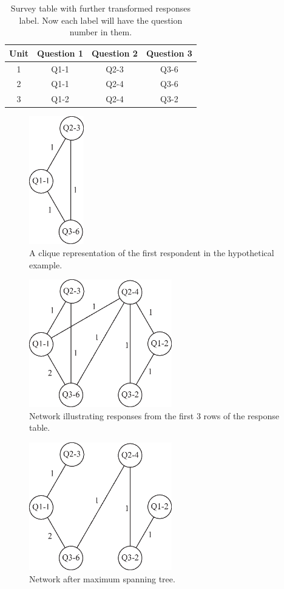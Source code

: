 \begin{table}
    \begin{tabular}[c]{||c c c c||}
        \hline
        \textbf{Unit} & \textbf{Question 1} & \textbf{Question 2} & \textbf{Question 3} \\
        \hline\hline
        1 & Q1-1 & Q2-3 & Q3-6 \\
        2 & Q1-1 & Q2-4 & Q3-6 \\
        3 & Q1-2 & Q2-4 & Q3-2 \\
        \hline
    \end{tabular}
    \caption{Survey table with further transformed responses label. Now each label will have the question number in them.}
    \label{tab:table4}
\end{table}

\begin{figure}[]
    \includegraphics[height=15em]{clique.eps}
    \caption{A clique representation of the first respondent in the hypothetical example.}
    \label{clique}
\end{figure}

\begin{figure}[]
    \includegraphics[height=15em]{graph.eps}
    \caption{Network illustrating responses from the first 3 rows of the response table.}
    \label{graph}
\end{figure}

\begin{figure}[]
    \includegraphics[height=15em]{tree.eps}
    \caption{Network after maximum spanning tree.}
    \label{tree}
\end{figure}

